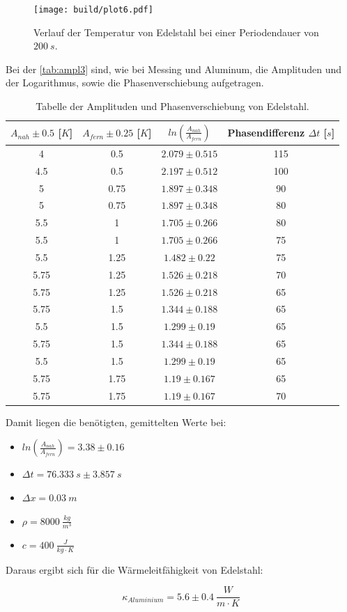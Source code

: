\begin{figure}[htbp]
    \centering
    \texttt{[image: build/plot6.pdf]}
    \caption{Verlauf der Temperatur von Edelstahl bei einer Periodendauer von $200\ s$.}
    \label{fig:dynamic3}
\end{figure}

Bei der \autoref{tab:ampl3} sind, wie bei Messing und Aluminum, die Amplituden und der Logarithmus, sowie die Phasenverschiebung aufgetragen.

\begin{table}
    \centering
    \caption{Tabelle der Amplituden und Phasenverschiebung von Edelstahl.}
    \label{tab:ampl3}
    \begin{tabular}{c|c|c|c}
        \toprule
        $A_{nah}\pm 0.5$ [$K$] & $A_{fern}\pm 0.25$ [$K$] & $ln(\frac{A_{nah}}{A_{fern}})$ & Phasendifferenz $\Delta t$ [$s$]\\
        \midrule
        4 & 0.5 & $2.079\pm 0.515$ & 115\\
        4.5 & 0.5 & $2.197\pm 0.512$ & 100\\
        5 & 0.75 & $1.897\pm 0.348$ & 90\\
        5 & 0.75 & $1.897\pm 0.348$ & 80\\
        5.5 & 1 & $1.705\pm 0.266$ & 80\\
        5.5 & 1 & $1.705\pm 0.266$ & 75\\
        5.5 & 1.25 & $1.482\pm 0.22$ & 75\\
        5.75 & 1.25 & $1.526\pm 0.218$ & 70\\
        5.75 & 1.25 & $1.526\pm 0.218$ & 65\\
        5.75 & 1.5 & $1.344\pm 0.188$ & 65\\
        5.5 & 1.5 & $1.299\pm 0.19$ & 65\\
        5.75 & 1.5 & $1.344\pm 0.188$ & 65\\
        5.5 & 1.5 & $1.299\pm 0.19$ & 65\\
        5.75 & 1.75 & $1.19\pm 0.167$ & 65\\
        5.75 & 1.75 & $1.19\pm 0.167$ & 70\\
        \bottomrule
    \end{tabular}
\end{table}
\newpage
Damit liegen die benötigten, gemittelten Werte bei:

\begin{itemize}
    \centering
    \item[] $ln(\frac{A_{nah}}{A_{fern}}) = 3.38\pm 0.16$
    \item[] $\Delta t = 76.333\ s\pm 3.857\ s$
    \item[] $\Delta x = 0.03\ m$
    \item[] $\rho = 8000\ \frac{kg}{m^3}$
    \item[] $c = 400\ \frac{J}{kg\cdot K}$
\end{itemize}

Daraus ergibt sich für die Wärmeleitfähigkeit von Edelstahl:

\begin{equation}
    \kappa_{Aluminium} = 5.6\pm 0.4\ \frac{W}{m\cdot K}
\end{equation}